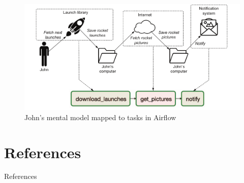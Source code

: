 \documentclass[14pt, aspectratio=169]{beamer}
\begin{document}
	\begin{frame}
		\begin{figure}[H]
			\centering
			\includegraphics[width=12cm]{mapped.png}
			\caption{John’s mental model mapped to tasks in Airflow}
		\end{figure}
	\end{frame}

	\section{References}
	\begin{frame}{References}
		
		
	\end{frame}
\end{document}
